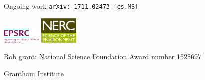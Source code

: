 \documentclass[a0paper,portrait]{baposter}
\begin{document}
\begin{poster}
\begin{posterbox}[name=future, column=0, below=rules, span=6]{Ongoing work}
    \texttt{arXiv: 1711.02473 [cs.MS]}

    \includegraphics[width=5em]{epsrc-logo}
    \includegraphics[width=5em]{nerc-logo}

    Rob grant: National Science Foundation Award number 1525697

    Grantham Institute
  \end{posterbox}
\end{poster}
\end{document}
